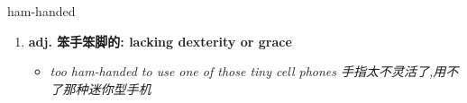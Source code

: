 
\begin{frame}
{\huge ham-handed}
\begin{center}
\begin{enumerate}\Large
  \item \textbf{adj. 笨手笨脚的: lacking dexterity or grace}
  \begin{itemize}
    \item \em{\Large{too ham-handed to use one of those tiny cell phones 手指太不灵活了,用不了那种迷你型手机}}
  \end{itemize}
\end{enumerate}
\end{center}
\end{frame}

